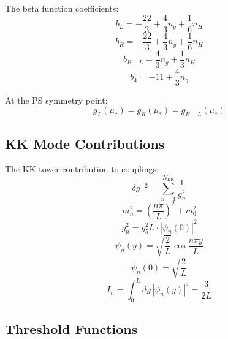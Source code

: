 \documentclass[11pt,a4paper]{article}
\begin{document}
The beta function coefficients:
\begin{equation}
\label{eq:ext-bL}
b_L = -\frac{22}{3} + \frac{4}{3}n_g + \frac{1}{6}n_H
\end{equation}
\begin{equation}
\label{eq:ext-bR}
b_R = -\frac{22}{3} + \frac{4}{3}n_g + \frac{1}{6}n_H
\end{equation}
\begin{equation}
\label{eq:ext-bBL}
b_{B-L} = \frac{4}{3}n_g + \frac{1}{3}n_H
\end{equation}
\begin{equation}
\label{eq:ext-b4}
b_4 = -11 + \frac{4}{3}n_g
\end{equation}

At the PS symmetry point:
\begin{equation}
\label{eq:ext-symmetry}
g_L(\mu_*) = g_R(\mu_*) = g_{B-L}(\mu_*)
\end{equation}

\subsection*{KK Mode Contributions}
\label{subsec:kk-contributions}

The KK tower contribution to couplings:
\begin{equation}
\label{eq:ext-kk-sum}
\delta g^{-2} = \sum_{n=1}^{N_{\text{KK}}} \frac{1}{g_n^2}
\end{equation}
\begin{equation}
\label{eq:ext-kk-mass}
m_n^2 = \left(\frac{n\pi}{L}\right)^2 + m_0^2
\end{equation}
\begin{equation}
\label{eq:ext-kk-coupling}
g_n^2 = g_5^2 L \cdot |\psi_n(0)|^2
\end{equation}
\begin{equation}
\label{eq:ext-kk-wf}
\psi_n(y) = \sqrt{\frac{2}{L}} \cos\frac{n\pi y}{L}
\end{equation}
\begin{equation}
\label{eq:ext-kk-wf0}
\psi_n(0) = \sqrt{\frac{2}{L}}
\end{equation}
\begin{equation}
\label{eq:ext-kk-overlap}
I_n = \int_0^L dy\, |\psi_n(y)|^4 = \frac{3}{2L}
\end{equation}

\subsection*{Threshold Functions}
\label{subsec:threshold-functions}
\end{document}
